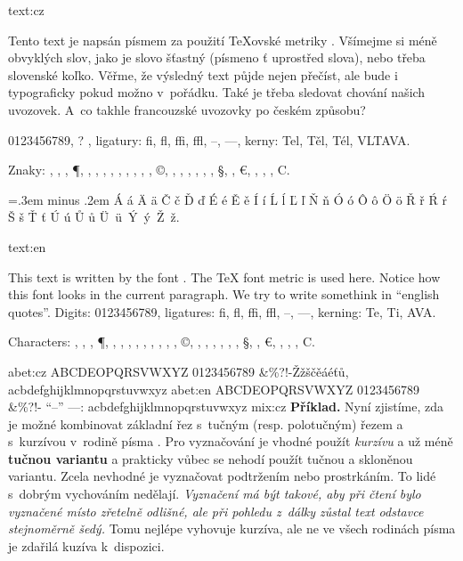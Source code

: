 \langdef text:cz {%
   Tento text je naps\'an p\'ismem \famplusvariant \space 
   za pou\v zit\'i \TeX{}ov\-sk\'e metriky 
   {\ttfont \fontname\fn}. V\v s\'imejme si m\'en\v e
   obvykl\'ych slov, jako je slovo \v s\v tast\-n\'y (p\'ismeno \v t uprost\v red slova),
   nebo t\v reba slovensk\'e ko\v lko. V\v e\v rme, \v ze v\'ysledn\'y text p\r ujde nejen
   p\v re\v c\'ist, ale bude i typograficky pokud mo\v zno v~po\v r\'adku. Tak\'e je t\v reba
   \clqq sledovat chov\'an\'i\crqq{} na\v sich \clqq{}uvozovek\crqq. A~co takhle \frqq
   francouzsk\'e uvozovky po \v cesk\'em zp\r usobu\flqq?
   \par
   0123456789,
   \knownchar\vardigits? \iftrue{}, \fi
   ligatury: fi, fl, ffi, ffl, --, ---, 
   kerny: Tel, T\v el, T\'el, VLTAVA.

   Znaky: \dag, \ddag, \textbullet,
       \P, \ellipsis,
       \textbraceleft, \fullbar, \brokenbar, \textbraceright, 
       \onequarter, \onehalf, \threequarters, 
       \trademark,  \copyright, \registered,
       \ligct, \ligst, \ligft, \longs, \longst, 
       \S, \sterling, \euro, \franc, \cent, 
       \yen, \degree C.
   \par\nobreak\medskip 
       {\spaceskip=.3em minus .2em \relax
       \'A \'a \"A \"a \v C \v c \v D \v d \'E \'e \v E \v e \'I \'i \'L \'l \v L \v l \v N \v n \'O \'o \^O \^o \"O \"o \v R \v r \'R \'r
       \v S \v s \v T \v t \'U \'u \r U \r u \"U~\"u~\'Y~\'y~\v Z~\v z.}
}
\langdef text:en {%
   This text is written by the font \famplusvariant.
   The \TeX{} font metric {\ttfont \fontname\fn} is used here.
   Notice how this font looks in the current paragraph.
   We try to write somethink in ``english quotes''.
   Digits: 0123456789, {} 
   ligatures: fi, fl, ffi, ffl, --, ---, 
   kerning: Te, Ti, AVA.

   Characters: \dag, \ddag, \textbullet,
       \P, \ellipsis,
       \textbraceleft, \fullbar, \brokenbar, \textbraceright, 
       \onequarter, \onehalf, \threequarters, 
       \trademark,  \copyright, \registered,
       \ligct, \ligst, \ligft, \longs, \longst, 
       \S, \pound, \euro, \franc, \cent, 
       \yen, \degree C.
}
\langdef abet:cz {%
   ABCDEOPQRSVWXYZ 0123456789 \&\%?!-\v Z\v z\v s\v c\v e\'a\'e\v t\r u,
   acbdefghijklmnopqrstuvwxyz%
}
\langdef abet:en {%
   ABCDEOPQRSVWXYZ 0123456789 \&\%?!- ``--'' ---:
   acbdefghijklmnopqrstuvwxyz%
}
\langdef mix:cz {%
   {\bf P\v r\'iklad.} Nyn\'i zjist\'ime, zda je mo\v zn\'e kombinovat z\'akladn\'i \v rez s~tu\v cn\'ym
   (resp. polotu\v cn\'ym) \v rezem a s~kurz\'ivou 
   v~rodin\v e p\'isma {\it\thisfamily}. Pro vyzna\v cov\'an\'i je vhodn\'e pou\v z\'it {\it kurz\'ivu\/} a
   u\v z m\'en\v e {\bf tu\v cnou variantu} a prakticky v\r ubec se nehod\'i pou\v z\'it
   {\bi tu\v cnou a sklon\v enou variantu}.
   Zcela nevhodn\'e je vyzna\v covat podtr\v zen\'im nebo prostrk\'an\'im.
   To lid\'e s~dobr\'ym vychov\'an\'im ned\v elaj\'i.
   {\it Vyzna\v cen\'i m\'a b\'yt takov\'e, aby p\v ri \v cten\'i bylo vyzna\v cen\'e m\'isto z\v reteln\v e 
   odli\v sn\'e, ale p\v ri pohledu z~d\'alky z\r ustal text odstavce stejnom\v ern\v e \v sed\'y.}
   Tomu nejl\'epe vyhovuje kurz\'iva, ale ne ve v\v sech rodin\'ach p\'isma je zda\v ril\'a
   kuz\'iva k~dispozici.
}
